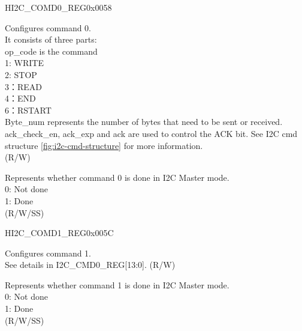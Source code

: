 \begin{register}{H}{I2C\_COMD0\_REG}{0x0058}\label{regdesc:I2CCOMD0REG}
%
%
%
\regnewline%
\begin{regdesc}\begin{reglist}
\label{fielddesc:I2CCOMMAND0}\item [I2C\_COMMAND0] Configures command 0. \\
It consists of three parts:\\ 
op\_code is the command\\
1: WRITE\\ 
2: STOP\\
3：READ\\
4：END\\
6：RSTART\\
Byte\_num represents the number of bytes that need to be sent or received.\\
ack\_check\_en, ack\_exp and ack are used to control the ACK bit. See I2C cmd structure \ref{fig:i2c-cmd-structure} for more information. \\(R/W)
\label{fielddesc:I2CCOMMAND0DONE}\item [I2C\_COMMAND0\_DONE] Represents whether command 0 is done in I2C Master mode.\\
0: Not done \\
1: Done \\ (R/W/SS)
\end{reglist}\end{regdesc}
\end{register}


\begin{register}{H}{I2C\_COMD1\_REG}{0x005C}\label{regdesc:I2CCOMD1REG}
%
%
%
\regnewline%
\begin{regdesc}\begin{reglist}
\label{fielddesc:I2CCOMMAND1}\item [I2C\_COMMAND1] Configures command 1.\\ 
See details in I2C\_CMD0\_REG[13:0]. (R/W)
\label{fielddesc:I2CCOMMAND1DONE}\item [I2C\_COMMAND1\_DONE] Represents whether command 1 is done in I2C Master mode.\\
0: Not done \\
1: Done \\ (R/W/SS)
\end{reglist}\end{regdesc}
\end{register}



